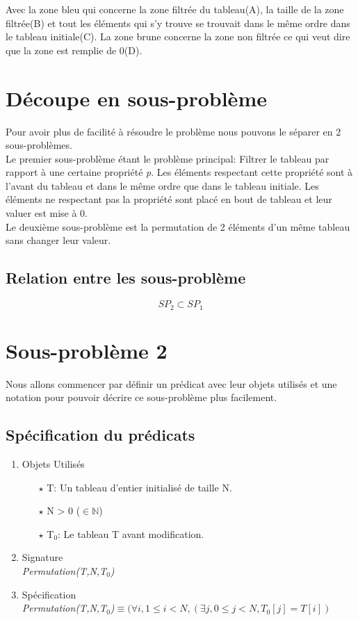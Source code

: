 \documentclass[a4paper, 11pt, oneside]{article}
\begin{document}
Avec la zone {\color[HTML]{3531FF}bleu} qui concerne la zone filtrée du tableau(A), la taille de la zone filtrée(B) et tout les éléments qui s'y trouve se trouvait dans le même ordre dans le tableau initiale(C). La zone {\color[HTML]{9A0000} brune} concerne la zone non filtrée ce qui veut dire que la zone est remplie de 0(D).

\section{Découpe en sous-problème}

Pour avoir plus de facilité à résoudre le problème nous pouvons le séparer en 2 sous-problèmes.\\
Le premier sous-problème étant le problème principal: Filtrer le tableau par rapport à une certaine propriété \textit{p}.
Les éléments respectant cette propriété sont à l'avant du tableau et dans le même ordre que dans le tableau initiale.
Les éléments ne respectant pas la propriété sont placé en bout de tableau et leur valuer est mise à 0.\\
Le deuxième sous-problème est la permutation de 2 éléments d'un même tableau sans changer leur valeur.

\subsection{Relation entre les sous-problème}

\[
    SP_2 \subset SP_1
\]
\section{Sous-problème 2}
    Nous allons commencer par définir un prédicat avec leur objets utilisés et une notation
    pour pouvoir décrire ce sous-problème plus facilement.

    \subsection{Spécification du prédicats}

        \begin{enumerate}
            \item Objets Utilisés
                \begin{itemize}
                    \item[$\star$] T: Un tableau d'entier initialisé de taille N.
                    \item[$\star$] N > 0 ($\in \mathbb{N}$)
                    \item[$\star$] T$_0$: Le tableau T avant modification.
                \end{itemize}

            \item Signature \\
                \textit{Permutation(T,N,T$_0$)}

            \item Spécification\\
                \textit{Permutation(T,N,T$_0$)}$\equiv (\forall i, 1\leq i < N, (\exists j, 0\leq j < N, T_0[j] = T[i])$
        \end{enumerate}
\end{document}
